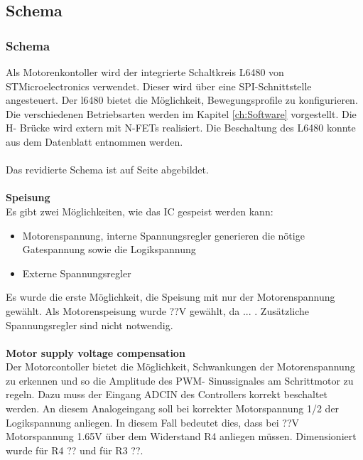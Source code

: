     \subsection{Schema} \label{sec:Schema}
    \fi
    \ifEMBED
    \subsubsection{Schema} \label{sec:Schema}
    \fi
    Als Motorenkontoller wird der integrierte Schaltkreis L6480 von 
    STMicroelectronics verwendet. Dieser wird über eine SPI-Schnittstelle 
    angesteuert. Der l6480 bietet die Möglichkeit, Bewegungsprofile zu 
    konfigurieren. Die verschiedenen Betriebsarten werden im Kapitel 
    \ref{ch:Software} vorgestellt. Die H- Brücke wird extern mit N-FETs 
    realisiert. Die Beschaltung des L6480 konnte aus dem Datenblatt 
    \cite{Datasheet:L6480} entnommen werden.\\\\ 
    Das revidierte Schema ist auf Seite \pageref{Schema} abgebildet.
    \\\\
    \textbf{Speisung}\\
    Es gibt zwei Möglichkeiten, wie das IC gespeist werden kann: 
    \begin{itemize}
        \item Motorenspannung, interne Spannungsregler generieren die nötige 
            Gatespannung sowie die Logikspannung
        \item Externe Spannungsregler
    \end{itemize}
    Es wurde die erste Möglichkeit, die Speisung mit nur der Motorenspannung 
    gewählt. Als Motorenspeisung wurde ??V gewählt, da ... . Zusätzliche 
    Spannungsregler sind nicht notwendig. 
    \\\\
    \textbf{Motor supply voltage compensation}\\
    Der Motorcontoller bietet die Möglichkeit, Schwankungen der 
    Motorenspannung zu erkennen und so die Amplitude des PWM- Sinussignales am 
    Schrittmotor zu regeln. Dazu muss der Eingang ADCIN des Controllers 
    korrekt beschaltet werden. An diesem Analogeingang soll bei korrekter 
    Motorspannung 1/2 der Logikspannung anliegen. In diesem Fall bedeutet 
    dies, dass bei ??V Motorspannung 1.65V über dem Widerstand R4 anliegen 
    müssen. Dimensioniert wurde für R4 ?? und für R3 ??.
    \\\\\
